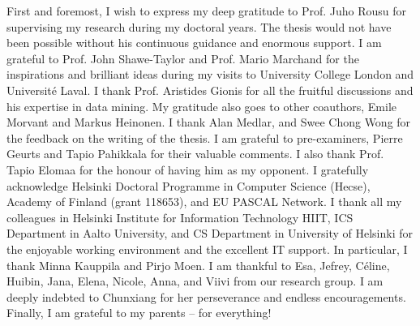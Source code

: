 

\begin{preface}[Espoo]

%
First and foremost, I wish to express my deep gratitude to Prof. Juho Rousu for supervising my research during my doctoral years.
The thesis would not have been possible without his continuous guidance and enormous  support. 
%
I am grateful to Prof. John Shawe-Taylor and Prof. Mario Marchand for the inspirations and brilliant ideas during my visits to University College London and Universit\'e Laval.
%
I thank Prof. Aristides Gionis for all the fruitful discussions and his expertise in data mining.
My gratitude also goes to other coauthors, Emile Morvant and Markus Heinonen. 
%
I thank Alan Medlar, and Swee Chong Wong for the feedback on the writing of the thesis.
I am grateful to pre-examiners, Pierre Geurts and Tapio Pahikkala for their valuable comments.
I also thank Prof. Tapio Elomaa for the honour of having him as my opponent.
%
I gratefully acknowledge Helsinki Doctoral Programme in Computer Science (Hecse), Academy of Finland (grant 118653), and EU PASCAL Network.
% 
I thank all my colleagues in Helsinki Institute for Information Technology HIIT, ICS Department in Aalto University, and CS Department in University of Helsinki for the enjoyable working environment and the excellent IT support.
In particular, I thank Minna Kauppila and Pirjo Moen.
%
I am thankful to Esa, Jefrey, C\'eline, Huibin, Jana, Elena, Nicole, Anna, and Viivi from our research group.
%
%
I am deeply indebted to Chunxiang for her perseverance and endless encouragements.
%
Finally, I am grateful to my parents -- for everything! 


\end{preface}
